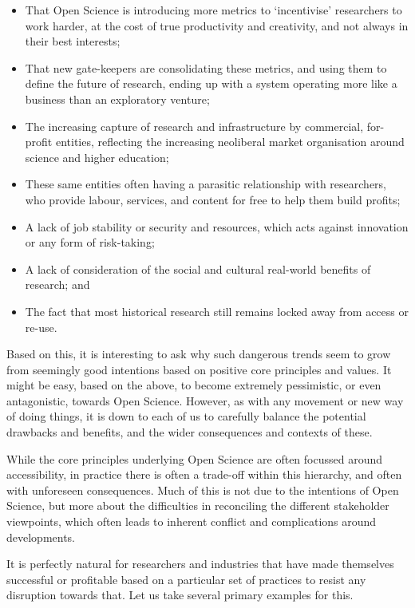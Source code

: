 \documentclass[]{book}
\begin{document}
\begin{itemize}
\item
  That Open Science is introducing more metrics to `incentivise' researchers to work harder, at the cost of true productivity and creativity, and not always in their best interests;
\item
  That new gate-keepers are consolidating these metrics, and using them to define the future of research, ending up with a system operating more like a business than an exploratory venture;
\item
  The increasing capture of research and infrastructure by commercial, for-profit entities, reflecting the increasing neoliberal market organisation around science and higher education;
\item
  These same entities often having a parasitic relationship with researchers, who provide labour, services, and content for free to help them build profits;
\item
  A lack of job stability or security and resources, which acts against innovation or any form of risk-taking;
\item
  A lack of consideration of the social and cultural real-world benefits of research; and
\item
  The fact that most historical research still remains locked away from access or re-use.
\end{itemize}

Based on this, it is interesting to ask why such dangerous trends seem to grow from seemingly good intentions based on positive core principles and values. It might be easy, based on the above, to become extremely pessimistic, or even antagonistic, towards Open Science. However, as with any movement or new way of doing things, it is down to each of us to carefully balance the potential drawbacks and benefits, and the wider consequences and contexts of these.

While the core principles underlying Open Science are often focussed around accessibility, in practice there is often a trade-off within this hierarchy, and often with unforeseen consequences. Much of this is not due to the intentions of Open Science, but more about the difficulties in reconciling the different stakeholder viewpoints, which often leads to inherent conflict and complications around developments.

It is perfectly natural for researchers and industries that have made themselves successful or profitable based on a particular set of practices to resist any disruption towards that. Let us take several primary examples for this.
\end{document}
